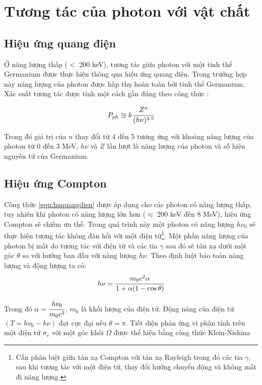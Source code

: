 \chapter{Tương tác của photon với vật chất}
\label{ch:cosolythuyet}

\section{Hiệu ứng quang điện}

Ở năng lượng thấp ($<$ 200 keV), tương tác giữa photon với một tinh thể Germanium được thực hiện thông qua hiệu ứng quang điện. Trong trường hợp này năng lượng của photon được hấp thụ hoàn toàn bởi tinh thể Germanium. Xác suất tương tác được tính một cách gần đúng theo công thức \cite{bib_Knoll}:

\begin{equation} 
P_{ph}\approxeq k\cfrac{Z^{n}}{(h\nu)^{3.5}}
\label{equ:huquangdien}
\end{equation}

Trong đó giá trị của $n$ thay đổi từ 4 đến 5 tương ứng với khoảng năng lượng của photon từ 0 đến 3 MeV, $h\nu$ và $Z$ lần lượt là năng lượng của photon và số hiệu nguyên tử của Germanium.

\section{Hiệu ứng Compton}

Công thức \ref{equ:huquangdien} được áp dụng cho các photon có năng lượng thấp, tuy nhiên khi photon có năng lượng lớn hơn ($\approx$ 200 keV đến 8 MeV), hiệu ứng Compton sẽ chiếm ưu thế. Trong quá trình này một photon có năng lượng $h\nu_{0}$ sẽ thực hiện tương tác không đàn hồi với một điện tử\footnote{Cần phân biệt giữa tán xạ Compton với tán xạ Rayleigh trong đó các tia $\gamma$, sau khi tương tác với một điện tử, thay đổi hướng chuyển động và không mất đi năng lượng.}. Một phần năng lượng của photon bị mất do tương tác với điện tử và các tia $\gamma$ sau đó sẽ tán xạ dưới một góc $\theta$ so với hướng ban đầu với năng lượng $h\nu$. Theo định luật bảo toàn năng lượng và động lượng ta có: 
%
\begin{equation}
h\nu=\cfrac{m_{0}c^{2}\alpha}{1+\alpha(1-\cos{\theta})}
\end{equation}

Trong đó $\alpha=\cfrac{h\nu_{0}}{m_{0}c^{2}}$, $m_{0}$ là khối lượng của điện tử. Động năng của điện tử $(T=h\nu_{0}-h\nu)$ đạt cực đại nếu $\theta=\pi$. Tiết diện phản ứng vi phân tính trên một điện tử $\sigma_{e}$ với một góc khối $\Omega$ được thể hiện bằng công thức Klein-Nishina\cite{bib_Klein}

